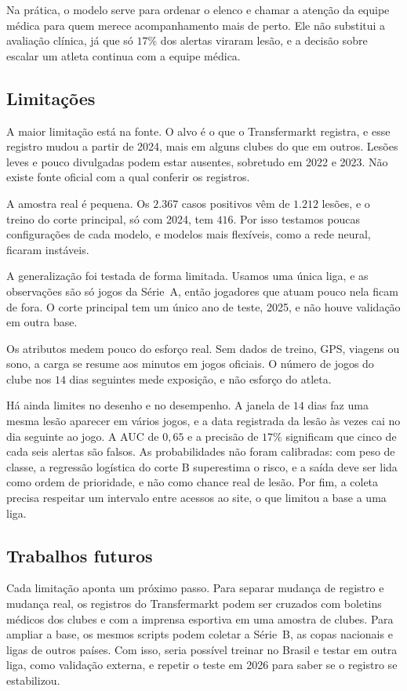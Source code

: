 \documentclass[conference]{IEEEtran}
\begin{document}
Na prática, o modelo serve para ordenar o elenco e chamar a atenção da equipe médica para quem merece acompanhamento mais de perto. Ele não substitui a avaliação clínica, já que só $17\%$ dos alertas viraram lesão, e a decisão sobre escalar um atleta continua com a equipe médica.

\subsection{Limitações}

A maior limitação está na fonte. O alvo é o que o Transfermarkt registra, e esse registro mudou a partir de 2024, mais em alguns clubes do que em outros. Lesões leves e pouco divulgadas podem estar ausentes, sobretudo em 2022 e 2023. Não existe fonte oficial com a qual conferir os registros.

A amostra real é pequena. Os $2{.}367$ casos positivos vêm de $1{.}212$ lesões, e o treino do corte principal, só com 2024, tem $416$. Por isso testamos poucas configurações de cada modelo, e modelos mais flexíveis, como a rede neural, ficaram instáveis.

A generalização foi testada de forma limitada. Usamos uma única liga, e as observações são só jogos da Série~A, então jogadores que atuam pouco nela ficam de fora. O corte principal tem um único ano de teste, 2025, e não houve validação em outra base.

Os atributos medem pouco do esforço real. Sem dados de treino, GPS, viagens ou sono, a carga se resume aos minutos em jogos oficiais. O número de jogos do clube nos $14$ dias seguintes mede exposição, e não esforço do atleta.

Há ainda limites no desenho e no desempenho. A janela de $14$ dias faz uma mesma lesão aparecer em vários jogos, e a data registrada da lesão às vezes cai no dia seguinte ao jogo. A AUC de $0{,}65$ e a precisão de $17\%$ significam que cinco de cada seis alertas são falsos. As probabilidades não foram calibradas: com peso de classe, a regressão logística do corte B superestima o risco, e a saída deve ser lida como ordem de prioridade, e não como chance real de lesão. Por fim, a coleta precisa respeitar um intervalo entre acessos ao site, o que limitou a base a uma liga.

\subsection{Trabalhos futuros}

Cada limitação aponta um próximo passo. Para separar mudança de registro e mudança real, os registros do Transfermarkt podem ser cruzados com boletins médicos dos clubes e com a imprensa esportiva em uma amostra de clubes. Para ampliar a base, os mesmos scripts podem coletar a Série~B, as copas nacionais e ligas de outros países. Com isso, seria possível treinar no Brasil e testar em outra liga, como validação externa, e repetir o teste em 2026 para saber se o registro se estabilizou.
\end{document}
